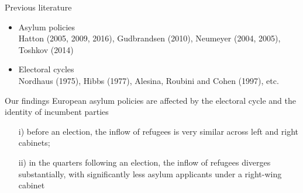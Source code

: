 \documentclass{beamer}
\begin{document}
	\begin{frame}{Previous literature}
\begin{itemize}
\item{Asylum policies}\\[1ex]
Hatton (2005, 2009, 2016), Gudbrandsen (2010), Neumeyer (2004, 2005), Toshkov (2014)\\[3ex]

\item{Electoral cycles}\\[1ex]
Nordhaus (1975), Hibbs (1977), Alesina, Roubini and Cohen (1997), etc.\\[3ex]
\end{itemize}
	\end{frame}

    \begin{frame}{Our findings}
European asylum policies are affected by the electoral cycle and the identity of incumbent parties\\[2ex]
\begin{itemize}
\item[i)]{before an election, the inflow of refugees is very similar across left and right cabinets;}\\[1ex]
\item[ii)]{in the quarters following an election, the inflow of refugees diverges substantially, with significantly less asylum applicants under a right-wing cabinet}\\[1ex]
\end{itemize}
	\end{frame}



\end{document}
